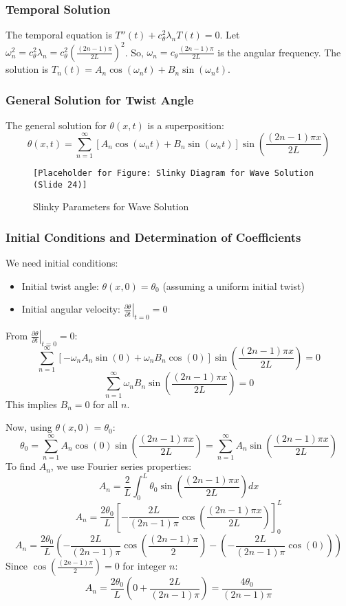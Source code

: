 \documentclass{mcmthesis}  %
\begin{document}
\subsubsection{Temporal Solution}
The temporal equation is \(T''(t) + c_{\theta}^2 \lambda_n T(t) = 0\).
Let \(\omega_n^2 = c_{\theta}^2 \lambda_n = c_{\theta}^2 \left(\frac{(2n-1)\pi}{2L}\right)^2\). So, \(\omega_n = c_{\theta} \frac{(2n-1)\pi}{2L}\) is the angular frequency.
The solution is \(T_n(t) = A_n \cos(\omega_n t) + B_n \sin(\omega_n t)\).

\subsubsection{General Solution for Twist Angle}
The general solution for \(\theta(x,t)\) is a superposition:
\[ \theta(x,t) = \sum_{n=1}^{\infty} [A_n \cos(\omega_n t) + B_n \sin(\omega_n t)] \sin\left(\frac{(2n-1)\pi x}{2L}\right) \]

\begin{figure}[h!]
    \centering
    \texttt{[Placeholder for Figure: Slinky Diagram for Wave Solution (Slide 24)]}
    \caption{Slinky Parameters for Wave Solution}
    \label{fig:wave_solution_params}
\end{figure}

\subsubsection{Initial Conditions and Determination of Coefficients}
We need initial conditions:
\begin{itemize}
    \item Initial twist angle: \(\theta(x,0) = \theta_0\) (assuming a uniform initial twist)
    \item Initial angular velocity: \(\left. \frac{\partial \theta}{\partial t} \right|_{t=0} = 0\)
\end{itemize}
From \(\left. \frac{\partial \theta}{\partial t} \right|_{t=0} = 0\):
\[ \sum_{n=1}^{\infty} [-\omega_n A_n \sin(0) + \omega_n B_n \cos(0)] \sin\left(\frac{(2n-1)\pi x}{2L}\right) = 0 \]
\[ \sum_{n=1}^{\infty} \omega_n B_n \sin\left(\frac{(2n-1)\pi x}{2L}\right) = 0 \]
This implies \(B_n = 0\) for all \(n\).

Now, using \(\theta(x,0) = \theta_0\):
\[ \theta_0 = \sum_{n=1}^{\infty} A_n \cos(0) \sin\left(\frac{(2n-1)\pi x}{2L}\right) = \sum_{n=1}^{\infty} A_n \sin\left(\frac{(2n-1)\pi x}{2L}\right) \]
To find \(A_n\), we use Fourier series properties:
\[ A_n = \frac{2}{L} \int_0^L \theta_0 \sin\left(\frac{(2n-1)\pi x}{2L}\right) dx \]
\[ A_n = \frac{2\theta_0}{L} \left[ -\frac{2L}{(2n-1)\pi} \cos\left(\frac{(2n-1)\pi x}{2L}\right) \right]_0^L \]
\[ A_n = \frac{2\theta_0}{L} \left( -\frac{2L}{(2n-1)\pi} \cos\left(\frac{(2n-1)\pi}{2}\right) - \left(-\frac{2L}{(2n-1)\pi} \cos(0)\right) \right) \]
Since \(\cos\left(\frac{(2n-1)\pi}{2}\right) = 0\) for integer \(n\):
\[ A_n = \frac{2\theta_0}{L} \left( 0 + \frac{2L}{(2n-1)\pi} \right) = \frac{4\theta_0}{(2n-1)\pi} \]
\end{document}
